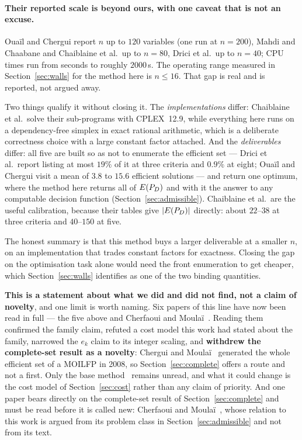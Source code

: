\documentclass[11pt,a4paper]{article}
\begin{document}
\paragraph{Their reported scale is beyond ours, with one caveat that is not
an excuse.}
Oua\"il and Chergui report $n$ up to $120$ variables (one run at $n=200$),
Mahdi and Chaabane and Chaiblaine et al.\ up to $n=80$, Drici et al.\ up to
$n=40$; CPU times run from seconds to roughly $2000$\,s.  The operating
range measured in Section~\ref{sec:walls} for the method here is
$n \leqslant 16$.  That gap is real and is reported, not argued away.

Two things qualify it without closing it.  The \emph{implementations}
differ: Chaiblaine et al.\ solve their sub-programs with CPLEX~12.9, while
everything here runs on a dependency-free simplex in exact rational
arithmetic, which is a deliberate correctness choice with a large constant
factor attached.  And the \emph{deliverables} differ: all five are built so
as not to enumerate the efficient set --- Drici et al.\ report listing at
most $19\%$ of it at three criteria and $0.9\%$ at eight; Oua\"il and
Chergui visit a mean of $3.8$ to $15.6$ efficient solutions --- and return
one optimum, where the method here returns all of $E(P_{D})$ and with it the
answer to any computable decision function (Section~\ref{sec:admissible}).
Chaiblaine et al.\ are the useful calibration, because their tables give
$|E(P_{D})|$ directly: about $22$--$38$ at three criteria and $40$--$150$ at five.

The honest summary is that this method buys a larger deliverable at a
smaller $n$, on an implementation that trades constant factors for
exactness.  Closing the gap on the optimisation task alone would need the
front enumeration to get cheaper, which Section~\ref{sec:walls} identifies
as one of the two binding quantities.

\textbf{This is a statement about what we did and did not find, not a claim of
novelty}, and one limit is worth naming.  Six papers of this line have now
been read in full --- the five above and Cherfaoui and
Moula\"i~\cite{cherfaoui2021}.  Reading them confirmed the family claim,
refuted a cost model this work had stated about the family, narrowed the
$e_k$ claim to its integer scaling, and \textbf{withdrew the complete-set
result as a novelty}: Chergui and Moula\"i~\cite{cherguimoulai2008}
generated the whole efficient set of a MOILFP in 2008, so
Section~\ref{sec:complete} offers a route and not a first.  Only the base
method~\cite{younsiabbaci2025} remains unread, and what it could change is
the cost model of Section~\ref{sec:cost} rather than any claim of priority.  And one paper bears directly on the complete-set
result of Section~\ref{sec:complete} and must be read before it is called
new: Cherfaoui and Moula\"i~\cite{cherfaoui2021}, whose relation to this work
is argued from its problem class in
Section~\ref{sec:admissible} and not from its text.
\end{document}
